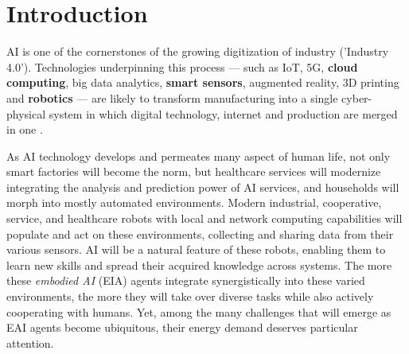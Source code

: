 \section{Introduction}\label{sec:intro}
\begin{fancyquotes}
	AI is one of the cornerstones of the growing digitization of industry ('Industry 4.0'). Technologies underpinning  this  process  ---  such as IoT,  5G,  \textbf{cloud  computing},  big  data  analytics,  \textbf{smart  sensors},  augmented  reality,  3D  printing  and  \textbf{robotics}  ---  are  likely  to  transform  manufacturing  into  a  single cyber-physical  system  in which digital  technology,  internet  and  production  are merged in one \cite{Szczepanski2019Economicimpactsartificial}.
\end{fancyquotes}
As AI technology develops and permeates many aspect of human life, not only smart factories will become the norm, but healthcare services will modernize integrating the analysis and prediction power of AI services, and households will morph into mostly automated environments. Modern industrial, cooperative, service, and healthcare robots with local and network computing capabilities will populate and act on these environments, collecting and sharing data from their various sensors. AI will be a natural feature of these robots, enabling them to learn new skills and spread their acquired knowledge across systems. The more these \emph{embodied AI} (EIA) agents integrate synergistically into these varied environments, the more they will take over diverse tasks while also actively cooperating with humans. Yet, among the many challenges that will emerge as EAI agents become ubiquitous, their energy demand deserves particular attention.

